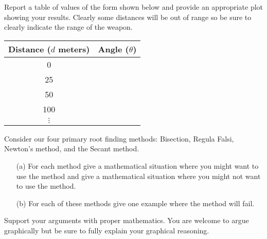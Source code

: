 \begin{problem}
\begin{enumerate}
            Report a table of values of the form shown below and provide an appropriate
            plot showing your results.  Clearly some distances will be out of range so be
            sure to clearly indicate the range of the weapon.
            \begin{center}
                \begin{tabular}{|c|c|}
                    \hline
                    Distance ($d$ meters) & Angle ($\theta$) \\ \hline \hline
                    0 & \\
                    25 & \\
                    50 & \\
                    100 & \\
                    $\vdots$ & \\ \hline
                \end{tabular}
            \end{center}
    \end{enumerate}
\end{problem}


\begin{problem}
    Consider our four primary root finding methods: Bisection, Regula Falsi, Newton's method, and the
    Secant method.  
    \begin{enumerate}
        \item[(a)] For each method give a mathematical situation where you might want to
            use the method and give a mathematical situation where you might not want to
            use the method.  
        \item[(b)] For each of these methods give one example where the method will fail.  
        \end{enumerate}
        Support your arguments with proper mathematics.  You are welcome to argue
        graphically but be sure to fully explain your graphical reasoning.
\end{problem}




